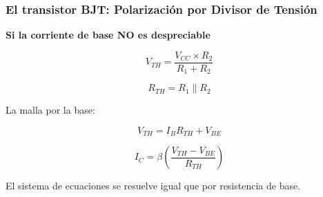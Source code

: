 \begin{frame}[t]
    \frametitle{El transistor BJT: Polarización por Divisor de Tensión}

    \begin{multicols}{2}
        \begin{figure}[H]
            \centering
        \end{figure}

        \newpage
        \textbf{Si la corriente de base NO es despreciable}

        \[ V_{TH} = \dfrac{V_{CC} \times R_2}{R_1 + R_2} \]

        \[ R_{TH} = R_1 \parallel R_2 \]

        La malla por la base:

        \[ V_{TH} = I_B R_{TH} + V_{BE} \]

        \[ I_C = \beta \left( \dfrac{V_{TH}-V_{BE}}{R_{TH}} \right) \]

        El sistema de ecuaciones se resuelve igual que por resistencia de base.
        
    \end{multicols}

\end{frame} 

